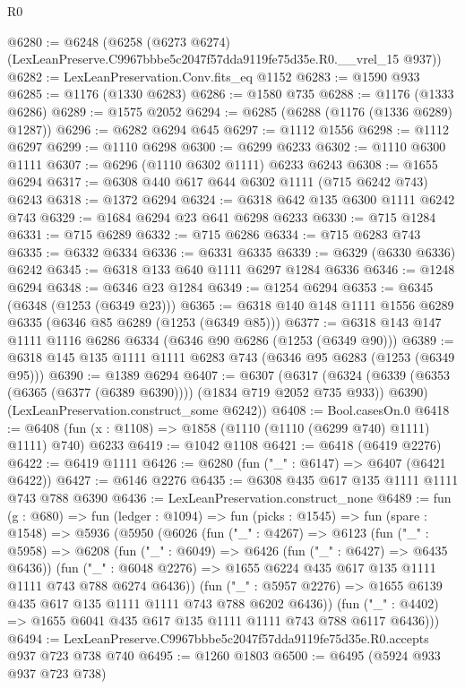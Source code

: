 \begin{lexlean}{R0}
\begin{coremodule}
@6280 := @6248
    (@6258 (@6273 @6274) (LexLeanPreserve.C9967bbbe5c2047f57dda9119fe75d35e.R0.__vrel_15 @937))
@6282 := LexLeanPreservation.Conv.fits_eq @1152
@6283 := @1590 @933
@6285 := @1176 (@1330 @6283)
@6286 := @1580 @735
@6288 := @1176 (@1333 @6286)
@6289 := @1575 @2052
@6294 := @6285 (@6288 (@1176 (@1336 @6289) @1287))
@6296 := @6282 @6294 @645
@6297 := @1112 @1556
@6298 := @1112 @6297
@6299 := @1110 @6298
@6300 := @6299 @6233
@6302 := @1110 @6300 @1111
@6307 := @6296 (@1110 @6302 @1111) @6233 @6243
@6308 := @1655 @6294
@6317 := @6308 @440 @617 @644 @6302 @1111 (@715 @6242 @743) @6243
@6318 := @1372 @6294
@6324 := @6318 @642 @135 @6300 @1111 @6242 @743
@6329 := @1684 @6294 @23 @641 @6298 @6233
@6330 := @715 @1284
@6331 := @715 @6289
@6332 := @715 @6286
@6334 := @715 @6283 @743
@6335 := @6332 @6334
@6336 := @6331 @6335
@6339 := @6329 (@6330 @6336) @6242
@6345 := @6318 @133 @640 @1111 @6297 @1284 @6336
@6346 := @1248 @6294
@6348 := @6346 @23 @1284
@6349 := @1254 @6294
@6353 := @6345 (@6348 (@1253 (@6349 @23)))
@6365 := @6318 @140 @148 @1111 @1556 @6289 @6335 (@6346 @85 @6289 (@1253 (@6349 @85)))
@6377 := @6318 @143 @147 @1111 @1116 @6286 @6334 (@6346 @90 @6286 (@1253 (@6349 @90)))
@6389 := @6318 @145 @135 @1111 @1111 @6283 @743 (@6346 @95 @6283 (@1253 (@6349 @95)))
@6390 := @1389 @6294
@6407 := @6307
    (@6317
      (@6324 (@6339 (@6353 (@6365 (@6377 (@6389 @6390)))) (@1834 @719 @2052 @735 @933)) @6390)
      (LexLeanPreservation.construct_some @6242))
@6408 := Bool.casesOn.{0}
@6418 := @6408 (fun (x : @1108) => @1858 (@1110 (@1110 (@6299 @740) @1111) @1111) @740) @6233
@6419 := @1042 @1108
@6421 := @6418 (@6419 @2276)
@6422 := @6419 @1111
@6426 := @6280 (fun ("_" : @6147) => @6407 (@6421 @6422))
@6427 := @6146 @2276
@6435 := @6308 @435 @617 @135 @1111 @1111 @743 @788 @6390
@6436 := LexLeanPreservation.construct_none
@6489 := fun (g : @680) =>
  fun (ledger : @1094) =>
  fun (picks : @1545) =>
  fun (spare : @1548) =>
  @5936
    (@5950
      (@6026
        (fun ("_" : @4267) =>
        @6123
          (fun ("_" : @5958) =>
          @6208
            (fun ("_" : @6049) => @6426 (fun ("_" : @6427) => @6435 @6436))
            (fun ("_" : @6048 @2276) =>
            @1655 @6224 @435 @617 @135 @1111 @1111 @743 @788 @6274 @6436))
          (fun ("_" : @5957 @2276) => @1655 @6139 @435 @617 @135 @1111 @1111 @743 @788 @6202 @6436))
        (fun ("_" : @4402) => @1655 @6041 @435 @617 @135 @1111 @1111 @743 @788 @6117 @6436)))
@6494 := LexLeanPreserve.C9967bbbe5c2047f57dda9119fe75d35e.R0.accepts @937 @723 @738 @740
@6495 := @1260 @1803
@6500 := @6495 (@5924 @933 @937 @723 @738)

\end{coremodule}
\end{lexlean}
